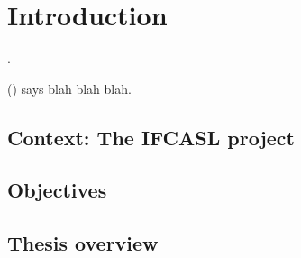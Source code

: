 %
%
\chapter{Introduction}
\label{chap:intro}


\blindtext \parencite{Duong2011}.

\citeauthor{Sitaram2011} (\citeyear{Sitaram2011}) says blah blah blah.


\section{Context: The IFCASL project}
\blindtext
\section{Objectives}
\blindtext
\section{Thesis overview}
\blindtext


